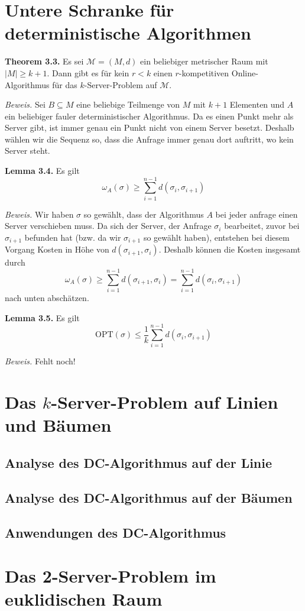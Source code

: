 \section{Untere Schranke für deterministische Algorithmen}

\textbf{Theorem 3.3.} Es sei $\mathcal{M} = (M,d)$ ein beliebiger metrischer Raum mit $|M| \geq k+1$. Dann gibt es für kein $r < k$ einen $r$-kompetitiven Online-Algorithmus für das $k$-Server-Problem auf $\mathcal{M}$.

\textit{Beweis.} Sei $B \subseteq M$ eine beliebige Teilmenge von $M$ mit $k+1$ Elementen und $A$ ein beliebiger fauler deterministischer Algorithmus. Da es einen Punkt mehr als Server gibt, ist immer genau ein Punkt nicht von einem Server besetzt. Deshalb wählen wir die Sequenz so, dass die Anfrage immer genau dort auftritt, wo kein Server steht.


\textbf{Lemma 3.4.} Es gilt $$\omega_A(\sigma) \geq \sum_{i=1}^{n-1}d(\sigma_i,\sigma_{i+1})$$

\textit{Beweis.} Wir haben $\sigma$ so gewählt, dass der Algorithmus $A$ bei jeder anfrage einen Server verschieben muss. Da sich der Server, der Anfrage $\sigma_i$ bearbeitet, zuvor bei $\sigma_{i+1}$ befunden hat (bzw. da wir $\sigma_{i+1}$ so gewählt haben), entstehen bei diesem Vorgang Kosten in Höhe von $d(\sigma_{i+1},\sigma_i)$. Deshalb können die Kosten insgesamt durch $$\omega_A(\sigma) \geq \sum_{i=1}^{n-1}d(\sigma_{i+1},\sigma_i) = \sum_{i=1}^{n-1}d(\sigma_i,\sigma_{i+1})$$ nach unten abschätzen.


\textbf{Lemma 3.5.} Es gilt $$\textrm{OPT}(\sigma) \leq \frac{1}{k}\sum_{i=1}^{n-1}d(\sigma_i,\sigma_{i+1})$$

\textit{Beweis.} Fehlt noch!


\section{Das $k$-Server-Problem auf Linien und Bäumen}

\subsection{Analyse des DC-Algorithmus auf der Linie}

\subsection{Analyse des DC-Algorithmus auf der Bäumen}

\subsection{Anwendungen des DC-Algorithmus}


\section{Das 2-Server-Problem im euklidischen Raum}
